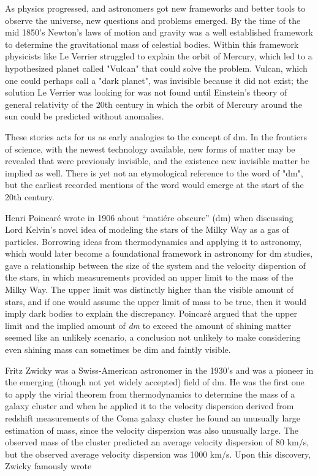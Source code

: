 As physics progressed, and astronomers got new frameworks and better tools to observe the universe, new questions and problems emerged. By the time of the mid 1850’s Newton’s laws of motion and gravity was a well established framework to determine the gravitational mass of celestial bodies. Within this framework physicists like Le Verrier struggled to explain the orbit of Mercury, which led to a hypothesized planet called "Vulcan" that could solve the problem. Vulcan, which one could perhaps call a "dark planet", was invisible because it did not exist; the solution Le Verrier was looking for was not found until Einstein's theory of general relativity of the 20th century in which the orbit of Mercury around the sun could be predicted without anomalies. \cite{bertone2016-history-dark-matter}

These stories acts for us as early analogies to the concept of \gls{dm}. In the frontiers of science, with the newest technology available, new forms of matter may be revealed that were previously invisible, and the existence new invisible matter be implied as well. There is yet not an etymological reference to the word of "\gls{dm}", but the earliest recorded mentions of the word would emerge at the start of the 20th century. \cite{bertone2016-history-dark-matter}

Henri Poincaré wrote in 1906 about “matiére obscure” (\gls{dm}) when discussing Lord Kelvin’s novel idea of modeling the stars of the Milky Way as a gas of particles. Borrowing ideas from thermodynamics and applying it to astronomy, which would later become a foundational framework in astronomy for \gls{dm} studies, gave a relationship between the size of the system and the velocity dispersion of the stars, in which measurements provided an upper limit to the mass of the Milky Way. The upper limit was distinctly higher than the visible amount of stars, and if one would assume the upper limit of mass to be true, then it would imply dark bodies to explain the discrepancy. Poincaré argued that the upper limit and the implied amount of \textit{\gls{dm}} to exceed the amount of shining matter seemed like an unlikely scenario, a conclusion not unlikely to make considering even shining mass can sometimes be dim and faintly visible. \cite{bertone2016-history-dark-matter}

Fritz Zwicky was a Swiss-American astronomer in the 1930's and was a pioneer in the emerging (though not yet widely accepted) field of \gls{dm}. He was the first one to apply the virial theorem from thermodynamics to determine the mass of a galaxy cluster and when he applied it to the velocity dispersion derived from redshift measurements of the Coma galaxy cluster he found an unusually large estimation of mass, since the velocity dispersion was also unusually large. The observed mass of the cluster predicted an average velocity dispersion of 80 km/s, but the observed average velocity dispersion was 1000 km/s. Upon this discovery, Zwicky famously wrote 

